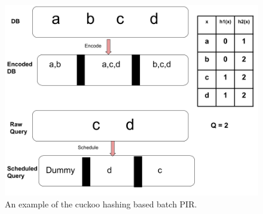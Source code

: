     
    
\begin{figure}
    \includegraphics[scale=0.45]{scribimg_batchpir.png}
    \caption{An example of the cuckoo hashing based batch PIR. \label{fig:sealpir}}
\end{figure}












